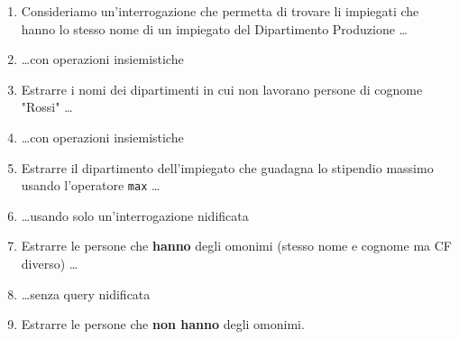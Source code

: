 \begin{enumerate}
	\item Consideriamo un'interrogazione che permetta di trovare li impiegati che hanno lo stesso nome di un impiegato del Dipartimento Produzione \dots
	

	\item \dots con operazioni insiemistiche
	

	\item Estrarre i nomi dei dipartimenti in cui non lavorano persone di cognome "Rossi" \dots
	

	\item \dots con operazioni insiemistiche
	

	\item Estrarre il dipartimento dell'impiegato che guadagna lo stipendio massimo usando l'operatore \texttt{max} \dots
	

	\item \dots usando solo un'interrogazione nidificata
	

	\item Estrarre le persone che \textbf{hanno} degli omonimi (stesso nome e cognome ma CF diverso) \dots
	

	\item \dots senza query nidificata
	

	\item Estrarre le persone che \textbf{non hanno} degli omonimi.
	

\end{enumerate}


	\newpage
	




